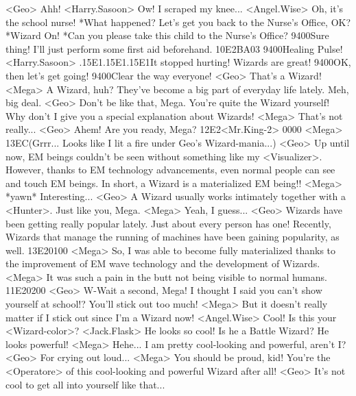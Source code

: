 <Geo> Ahh! 
<Harry.Sasoon> Ow! 
I scraped my knee... 
<Angel.Wise> Oh, it's the school nurse! 
*What happened? Let's get you back to the Nurse's Office, OK? 
*Wizard On! 
*Can you please take this child to the Nurse's Office? 
{94}{00}Sure thing! I'll just perform some first aid beforehand. 
{10}{E2}{BA}{03} 
{94}{00}Healing Pulse! 
<Harry.Sasoon> .{15}{E1}.{15}{E1}.{15}{E1}It stopped hurting! 
Wizards are great! 
{94}{00}OK, then let's get going! 
{94}{00}Clear the way everyone! 
<Geo> That's a Wizard! 
<Mega> A Wizard, huh? They've become a big part of everyday life lately. 
Meh, big deal. 
<Geo> Don't be like that, Mega. 
You're quite the Wizard yourself! 
Why don't I give you a special explanation about Wizards! 
<Mega> That's not really... 
<Geo> Ahem! Are you ready, Mega? 
{12}{E2}<Mr.King-2> {00}{00} 
<Mega> {13}{EC}(Grrr...  Looks like I lit a fire  under Geo's Wizard-mania...) 
<Geo> Up until now, EM beings couldn't be seen without something like my <Visualizer>. 
However, thanks to EM technology advancements, 
even normal people can see and touch EM beings. 
In short, a Wizard is a  materialized EM being!! 
<Mega> *yawn* Interesting... 
<Geo> A Wizard usually works intimately together with a <Hunter>. 
Just like you, Mega. 
<Mega> Yeah, I guess... 
<Geo> Wizards have been getting really popular lately. 
Just about every person has one! 
Recently, Wizards that manage the running of 
machines have been gaining popularity, as well. 
{13}{E2}{01}{00} 
<Mega> So, I was able to become fully materialized thanks to the improvement of EM 
wave technology and the development of Wizards. 
<Mega> It was such a pain in the butt not being visible to normal humans. 
{11}{E2}{02}{00} 
<Geo> W-Wait a second, Mega! 
I thought I said you can't show yourself at school!? You'll stick out too much! 
<Mega> But it doesn't really matter if I stick out since I'm a Wizard now! 
<Angel.Wise> Cool! Is this your <Wizard-color>? 
<Jack.Flask> He looks so cool! Is he a Battle Wizard? He looks powerful! 
<Mega> Hehe... I am pretty cool-looking and powerful, aren't I? 
<Geo> For crying out loud... 
<Mega> You should be proud, kid! 
You're the <Operatore> of this cool-looking and powerful Wizard after all! 
<Geo> It's not cool to get all into yourself like that... 
